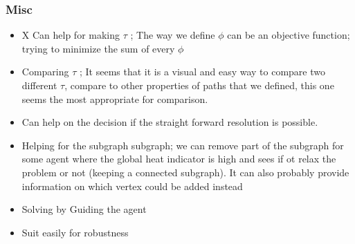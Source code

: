 \subsubsection{Misc}



\begin{itemize}
  \item X Can help for making \(\tau\) ; The way we define \(\phi\) can be an objective function; trying to minimize the sum of every \(\phi\) 
  \item Comparing \(\tau\) ; It seems that it is a visual and easy way to compare two different \(\tau\), compare to other properties of paths that we defined, this one seems the most appropriate for comparison.
  \item Can help on the decision if the straight forward resolution is possible.
  \item Helping for the subgraph subgraph; we can remove part of the subgraph for some agent where the global heat indicator is high and sees if ot relax the problem or not (keeping a connected subgraph). It can also probably provide information on which vertex could be added instead
  \item Solving by Guiding the agent
  \item Suit easily for robustness
\end{itemize}


